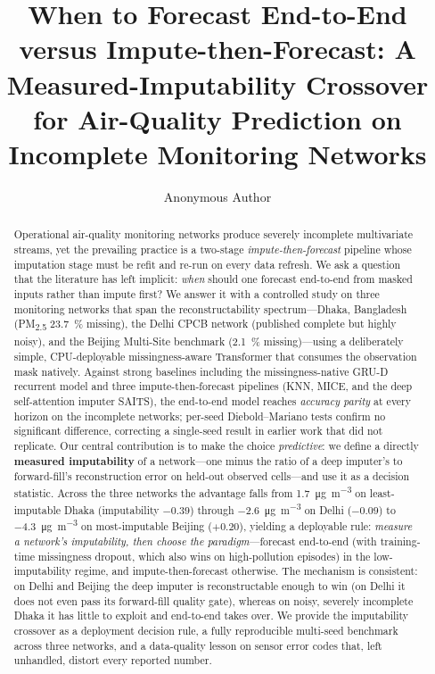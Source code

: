 \documentclass[review,3p,times]{elsarticle}
\newcommand{\ugm}{\si{\micro\gram\per\cubic\metre}}
\newcommand{\pmf}{PM\textsubscript{2.5}}
\begin{document}
\begin{frontmatter}

\title{When to Forecast End-to-End versus Impute-then-Forecast:
A Measured-Imputability Crossover for Air-Quality Prediction on
Incomplete Monitoring Networks}

\author[a]{Anonymous Author}
\address[a]{Anonymous Institution}

\begin{abstract}
Operational air-quality monitoring networks produce severely incomplete
multivariate streams, yet the prevailing practice is a two-stage
\emph{impute-then-forecast} pipeline whose imputation stage must be refit and
re-run on every data refresh. We ask a question that the literature has left
implicit: \emph{when} should one forecast end-to-end from masked inputs rather
than impute first? We answer it with a controlled study on three monitoring
networks that span the reconstructability spectrum---Dhaka, Bangladesh (\pmf{}
\SI{23.7}{\percent} missing), the Delhi CPCB network (published complete but
highly noisy), and the Beijing Multi-Site benchmark (\SI{2.1}{\percent}
missing)---using a deliberately simple, CPU-deployable missingness-aware
Transformer that consumes the observation mask natively. Against strong baselines
including the missingness-native GRU-D recurrent model and three
impute-then-forecast pipelines (KNN, MICE, and the deep self-attention imputer
SAITS), the end-to-end model reaches \emph{accuracy parity} at every horizon on
the incomplete networks; per-seed Diebold--Mariano tests confirm no significant
difference, correcting a single-seed result in earlier work that did not
replicate. Our central contribution is to make the choice \emph{predictive}: we
define a directly \textbf{measured imputability} of a network---one minus the
ratio of a deep imputer's to forward-fill's reconstruction error on held-out
observed cells---and use it as a decision statistic. Across the
three networks the advantage falls from \SI{+1.7}{\ugm} on least-imputable Dhaka
(imputability $-0.39$) through \SI{-2.6}{\ugm} on Delhi ($-0.09$) to
\SI{-4.3}{\ugm} on most-imputable Beijing ($+0.20$), yielding a deployable rule:
\emph{measure a network's imputability, then choose the paradigm}---forecast
end-to-end (with training-time missingness dropout, which also wins on
high-pollution episodes) in the low-imputability regime, and impute-then-forecast
otherwise. The mechanism is consistent: on Delhi and Beijing the deep imputer is
reconstructable enough to win (on Delhi it does not even pass its forward-fill
quality gate), whereas on noisy, severely incomplete Dhaka it has little to
exploit and end-to-end takes over. We provide the imputability crossover as a
deployment decision rule, a fully reproducible multi-seed benchmark across three
networks, and a data-quality lesson on sensor error codes that, left unhandled,
distort every reported number.
\end{abstract}


\end{frontmatter}
\end{document}
